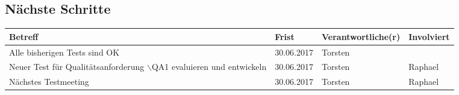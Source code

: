 \documentclass{scrartcl}
\begin{document}
\subsection{Nächste Schritte}
\begin{tabular}{L{.249} L{.2} L{.25} L{.25}}
Betreff & Frist & Verantwortliche(r) & Involviert\\\hline
Alle bisherigen Tests sind OK& 30.06.2017&Torsten & \\
Neuer Test für Qualitätsanforderung $\backslash$QA1 evaluieren und entwickeln& 30.06.2017& Torsten & Raphael\\
Nächstes Testmeeting&30.06.2017&Torsten&Raphael\\
\end{tabular}
\end{document}
